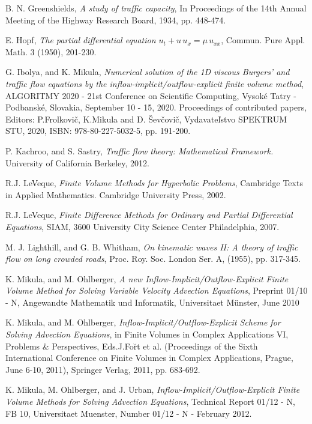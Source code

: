 \documentclass[../include.tex]{subfiles}
\begin{document}
\begin{thebibliography}{99}
	 {\sc B. N. Greenshields},
	{\em A study of traffic capacity}, In Proceedings of the 14th Annual Meeting of the Highway Research Board, 1934, pp. 448-474.

	 {\sc E. Hopf},
	{\em The partial differential equation $ u_t + u\,u_x = \mu\, u_{xx} $}, Commun. Pure Appl. Math. 3 (1950), 201-230.

	 {\sc G. Ibolya, and K. Mikula},
	{\em Numerical solution of the 1D viscous Burgers' and traffic flow equations by the inflow-implicit/outflow-explicit finite volume method}, ALGORITMY 2020 - 21st Conference on Scientific Computing, Vysoké Tatry - Podbanské, Slovakia, September 10 - 15, 2020. Proceedings of contributed papers, Editors: P.Frolkovič, K.Mikula and D. Ševčovič, Vydavateľstvo SPEKTRUM STU, 2020, ISBN: 978-80-227-5032-5, pp. 191-200.

	 {\sc P. Kachroo, and S. Sastry},
	{\em Traffic flow theory: Mathematical Framework.} University of California Berkeley, 2012.

	 {\sc R.J. LeVeque},
	{\em Finite Volume Methods for Hyperbolic Problems}, Cambridge Texts in Applied Mathematics. Cambridge University Press, 2002.

	 {\sc R.J. LeVeque},
	{\em Finite Difference Methods for Ordinary and Partial Differential Equations}, SIAM, 3600 University City Science Center Philadelphia, 2007.

	 {\sc M. J. Lighthill, and G. B. Whitham},
	{\em On kinematic waves II: A theory of traffic flow on long crowded roads}, Proc. Roy. Soc. London Ser. A, (1955), pp. 317-345.

	 {\sc K. Mikula, and M. Ohlberger},
	{\em A new Inflow-Implicit/Outflow-Explicit Finite Volume Method for Solving Variable Velocity Advection Equations}, Preprint 01/10 - N, Angewandte Mathematik und Informatik, Universitaet M\"{u}nster, June 2010

	 {\sc K. Mikula, and M. Ohlberger},
	{\em Inflow-Implicit/Outflow-Explicit Scheme for Solving Advection Equations}, in Finite Volumes in Complex Applications VI, Problems \& Perspectives, Eds.J.Fo\u{r}t et al. (Proceedings of the Sixth International Conference on Finite Volumes in Complex Applications, Prague, June 6-10, 2011), Springer Verlag, 2011, pp. 683-692.

	 {\sc K. Mikula, M. Ohlberger, and J. Urban},
	{\em Inflow-Implicit/Outflow-Explicit Finite Volume Methods for Solving Advection Equations}, Technical Report 01/12 - N, FB 10, Universitaet Muenster, Number 01/12 - N - February 2012.


\end{thebibliography}
\end{document}
